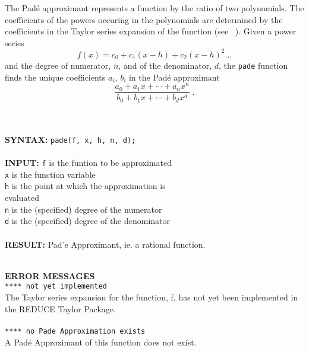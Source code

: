 The Pad\'{e} approximant represents a function by the ratio of two 
polynomials. The coefficients of the powers occuring in the polynomials 
are determined by the coefficients in the Taylor series
expansion of the function (see ~\cite{PA}). Given a power series
\[ f(x) = c_0 + c_1 (x-h) + c_2 (x-h)^2 \ldots \]
and the degree of numerator, $n$, and of the denominator, $d$,
the {\tt pade} function finds the unique coefficients 
$a_i,\, b_i$ in the Pad\'{e} approximant 
\[ \frac{a_0+a_1 x+ \cdots + a_n x^n}{b_0+b_1 x+ \cdots + b_d x^d} \; .\]
\\ \\

\begin{tabbing}
{\bf SYNTAX:} \hspace{5mm}\= {\tt pade(f, x, h, n, d);}\\ \\

{\bf INPUT:}
\> {\tt f} \hspace{3mm} \= is the funtion to be approximated\\
\> {\tt x}             \> is the function variable\\
\> {\tt h}             \> is the point at which the approximation is\\ 
\>                     \> evaluated\\
\> {\tt n}             \> is the (specified) degree of the numerator\\
\> {\tt d}             \> is the (specified) degree of the denominator\\ \\


{\bf RESULT:} 
\> Pad\a'{e} Approximant, ie. a rational function.\\ \\
\end{tabbing}


{\bf ERROR MESSAGES}\\

{\tt ***** not yet implemented}\\

The Taylor series expansion for the function, f, has not yet
been implemented in the {\small REDUCE} Taylor Package.\\ \\


{\tt ***** no Pade Approximation exists}\\

A Pad\'{e} Approximant of this function does not exist.\\ \\

